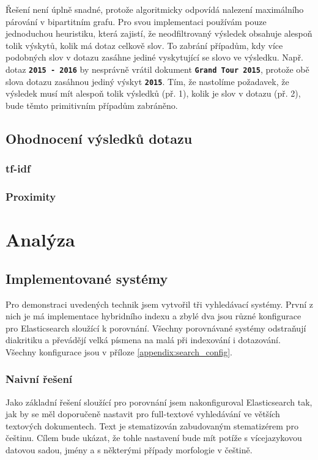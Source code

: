 \documentclass[12pt,letterpaper,oneside,openright]{book}
\newcommand{\bftt}[1]{\texttt{\textbf{#1}}}
\begin{document}
Řešení není úplně snadné, protože algoritmicky odpovídá nalezení maximálního
párování v bipartitním grafu. Pro svou implementaci používám pouze jednoduchou
heuristiku, která zajistí, že neodfiltrovaný výsledek obsahuje alespoň tolik
výskytů, kolik má dotaz celkově slov. To zabrání případům, kdy více podobných
slov v dotazu zasáhne jediné vyskytující se slovo ve výsledku. Např. dotaz
\bftt{2015 - 2016} by nesprávně vrátil dokument \bftt{Grand Tour 2015}, protože
obě slova dotazu zasáhnou jediný výskyt \bftt{2015}. Tím, že nastolíme
požadavek, že výsledek musí mít alespoň tolik výsledků (př. 1), kolik je slov v
dotazu (př. 2), bude těmto primitivním případům zabráněno.


\section{Ohodnocení výsledků dotazu}
\subsection{tf-idf}
\subsection{Proximity}


\chapter{Analýza}
\section{Implementované systémy}
Pro demonstraci uvedených technik jsem vytvořil tři vyhledávací systémy. První
z nich je má implementace hybridního indexu a zbylé dva jsou různé konfigurace
pro Elasticsearch sloužící k porovnání. Všechny porovnávané systémy odstraňují
diakritiku a převádějí velká písmena na malá při indexování i dotazování.
Všechny konfigurace jsou v příloze \ref{appendix:search_config}.

\subsection{Naivní řešení}
Jako základní řešení sloužící pro porovnání jsem nakonfiguroval Elasticsearch
tak, jak by se měl doporučeně nastavit pro full-textové vyhledávání ve větších
textových dokumentech. Text je stematizován zabudovaným stematizérem pro
češtinu. Cílem bude ukázat, že tohle nastavení bude mít potíže s vícejazykovou
datovou sadou, jmény a s některými případy morfologie v češtině.
\end{document}
